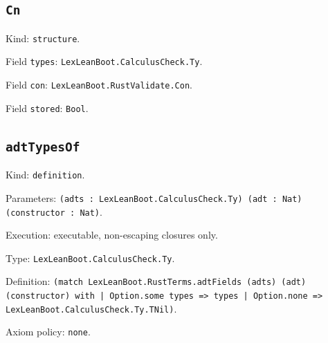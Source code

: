 \documentclass[11pt]{article}
\begin{document}
\subsection*{\texttt{Cn}}
\noindent Kind: \texttt{structure}.\par
\noindent Field \texttt{types}: \texttt{LexLeanBoot.CalculusCheck.Ty}.\par
\noindent Field \texttt{con}: \texttt{LexLeanBoot.RustValidate.Con}.\par
\noindent Field \texttt{stored}: \texttt{Bool}.\par
\subsection*{\texttt{adtTypesOf}}
\noindent Kind: \texttt{definition}.\par
\noindent Parameters: \texttt{(adts : LexLeanBoot.CalculusCheck.Ty) (adt : Nat) (constructor : Nat)}.\par
\noindent Execution: executable, non-escaping closures only.\par
\noindent Type: \texttt{LexLeanBoot.CalculusCheck.Ty}.\par
\noindent Definition: \texttt{(match LexLeanBoot.RustTerms.adtFields (adts) (adt) (constructor) with | Option.some types => types | Option.none => LexLeanBoot.CalculusCheck.Ty.TNil)}.\par
\noindent Axiom policy: \texttt{none}.\par
\end{document}
